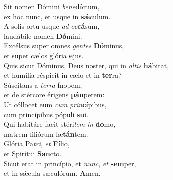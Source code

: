 \evenverse Sit nomen Dómini \textit{be}\textit{ne}\textbf{dí}ctum,~\*\\
\evenverse ex hoc nunc, et usque in \textbf{sǽ}culum.\\
\oddverse A solis ortu usque \textit{ad} \textit{oc}\textbf{cá}sum,~\*\\
\oddverse laudábile nomen \textbf{Dó}mini.\\
\evenverse Excélsus super omnes \textit{gen}\textit{tes} \textbf{Dó}minus,~\*\\
\evenverse et super cælos glória \textbf{e}jus.\\
\oddverse Quis sicut Dóminus, Deus noster, qui in \textit{al}\textit{tis} \textbf{há}bitat,~\*\\
\oddverse et humília réspicit in cælo et in \textbf{ter}ra?\\
\evenverse Súscitans a \textit{ter}\textit{ra} \textbf{í}nopem,~\*\\
\evenverse et de stércore érigens \textbf{páu}perem:\\
\oddverse Ut cóllocet eum \textit{cum} \textit{prin}\textbf{cí}pibus,~\*\\
\oddverse cum princípibus pópuli \textbf{su}i.\\
\evenverse Qui habitáre facit stéri\textit{lem} \textit{in} \textbf{do}mo,~\*\\
\evenverse matrem filiórum læ\textbf{tán}tem.\\
\oddverse Glória Pa\textit{tri}, \textit{et} \textbf{Fí}lio,~\*\\
\oddverse et Spirítui \textbf{San}cto.\\
\evenverse Sicut erat in princípio, et \textit{nunc}, \textit{et} \textbf{sem}per,~\*\\
\evenverse et in sǽcula sæculórum. \textbf{A}men.\\
